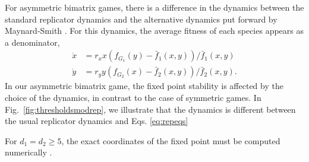\documentclass{pnastwo}
\begin{document}
\begin{article}

For asymmetric bimatrix games, there is a difference in the dynamics between the standard replicator dynamics and the 
alternative dynamics put forward by Maynard-Smith \cite{maynard-smith:1982to}.
For this dynamics, the average fitness of each species appears as a denominator,
\begin{align}
\dot{x} &= r_x x \left(f_{G_1}(y) -  \bar{f}_1(x,y) \right)/\bar{f}_1(x,y) \nonumber \\
\dot{y} &= r_y y \left(f_{G_2}(x) -  \bar{f}_2(x,y) \right)/\bar{f}_2(x,y).
\label{eq:repeqs}
\end{align}
In our asymmetric bimatrix game, the fixed point stability is affected by the choice of the dynamics, in contrast to the case of symmetric games. 
In Fig.\ \ref{fig:thresholdsmodrep}, we illustrate that the dynamics is different between the usual 
replicator dynamics and Eqs. \ref{eq:repeqs}

For $d_1=d_2 \geq 5$, the exact coordinates of the fixed point must be computed numerically \cite{abel:1824aa,stewart:2004aa}.





\end{article}
\end{document}
